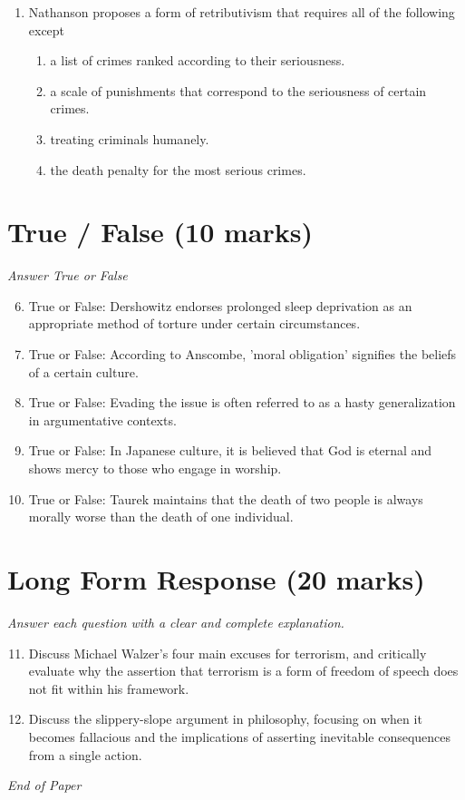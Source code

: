 \documentclass[12pt]{article}
\begin{document}
\begin{enumerate}[label=\arabic*.]
\begin{enumerate}[label=(\alph*)]
    \item descriptive use.
    \item inferential use.
    \item propositional use.
    \item expressive use.
\end{enumerate}
\item Nathanson proposes a form of retributivism that requires all of the following except
\begin{enumerate}[label=(\alph*)]
    \item a list of crimes ranked according to their seriousness.
    \item a scale of punishments that correspond to the seriousness of certain crimes.
    \item treating criminals humanely.
    \item the death penalty for the most serious crimes.
\end{enumerate}
\end{enumerate}

\section*{True / False (10 marks)}
\textit{Answer True or False}
\begin{enumerate}[label=\arabic*.]
\setcounter{enumi}{5}
\item True or False: Dershowitz endorses prolonged sleep deprivation as an appropriate method of torture under certain circumstances.
\item True or False: According to Anscombe, 'moral obligation' signifies the beliefs of a certain culture.
\item True or False: Evading the issue is often referred to as a hasty generalization in argumentative contexts.
\item True or False: In Japanese culture, it is believed that God is eternal and shows mercy to those who engage in worship.
\item True or False: Taurek maintains that the death of two people is always morally worse than the death of one individual.
\end{enumerate}

\section*{Long Form Response (20 marks)}
\textit{Answer each question with a clear and complete explanation.}
\begin{enumerate}[label=\arabic*.]
\setcounter{enumi}{10}
\item Discuss Michael Walzer's four main excuses for terrorism, and critically evaluate why the assertion that terrorism is a form of freedom of speech does not fit within his framework.
\item Discuss the slippery-slope argument in philosophy, focusing on when it becomes fallacious and the implications of asserting inevitable consequences from a single action.
\end{enumerate}

\vfill
\noindent\textit{End of Paper}
\end{document}
